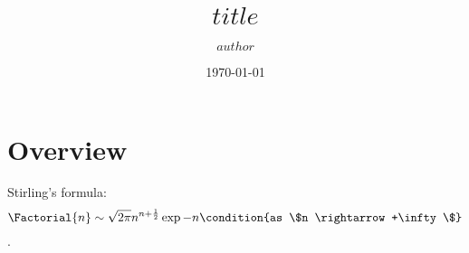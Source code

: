 \documentclass[onecolumn,a4paper,11pt]{article}
\title{$title$}
\author{$author$}
\affiliation{$organisation$}
\date{\today}
\begin{document}
\maketitle

\section{Overview}
\label{sec:overview}
Stirling's formula:
\begin{dmath}[label={stirling}]
   \Factorial{n} \sim  \sqrt{2\pi} n^{n+ \frac{1}{2}} \exp{-n} 
   \condition{as
      \$n \rightarrow+\infty\$}
\end{dmath}.

\printbibliography
\end{document}
